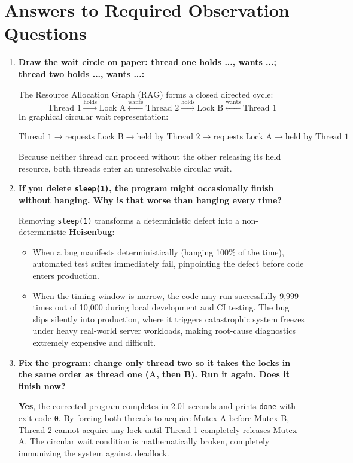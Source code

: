 \documentclass[12pt,a4paper]{report}
\numberwithin{equation}{chapter}
\numberwithin{figure}{chapter}
\numberwithin{table}{chapter}
\begin{document}
\section{Answers to Required Observation Questions}
\begin{enumerate}
    \item \textbf{Draw the wait circle on paper: thread one holds ..., wants ...; thread two holds ..., wants ...:}
    
    The Resource Allocation Graph (RAG) forms a closed directed cycle:
    \begin{equation}
    \text{Thread 1} \xrightarrow{\text{holds}} \text{Lock A} \xleftarrow{\text{wants}} \text{Thread 2} \xrightarrow{\text{holds}} \text{Lock B} \xleftarrow{\text{wants}} \text{Thread 1}
    \end{equation}
    In graphical circular wait representation:
    \begin{center}
    $\text{Thread 1} \longrightarrow \text{requests Lock B} \longrightarrow \text{held by Thread 2} \longrightarrow \text{requests Lock A} \longrightarrow \text{held by Thread 1}$
    \end{center}
    Because neither thread can proceed without the other releasing its held resource, both threads enter an unresolvable circular wait.

    \item \textbf{If you delete \texttt{sleep(1)}, the program might occasionally finish without hanging. Why is that worse than hanging every time?}
    
    Removing \texttt{sleep(1)} transforms a deterministic defect into a non-deterministic \textbf{Heisenbug}:
    \begin{itemize}
        \item When a bug manifests deterministically (hanging 100\% of the time), automated test suites immediately fail, pinpointing the defect before code enters production.
        \item When the timing window is narrow, the code may run successfully 9,999 times out of 10,000 during local development and CI testing. The bug slips silently into production, where it triggers catastrophic system freezes under heavy real-world server workloads, making root-cause diagnostics extremely expensive and difficult.
    \end{itemize}

    \item \textbf{Fix the program: change only thread two so it takes the locks in the same order as thread one (A, then B). Run it again. Does it finish now?}
    
    \textbf{Yes}, the corrected program completes in 2.01 seconds and prints \texttt{done} with exit code \texttt{0}.
    By forcing both threads to acquire Mutex A before Mutex B, Thread 2 cannot acquire any lock until Thread 1 completely releases Mutex A. The circular wait condition is mathematically broken, completely immunizing the system against deadlock.
\end{enumerate}
\end{document}
